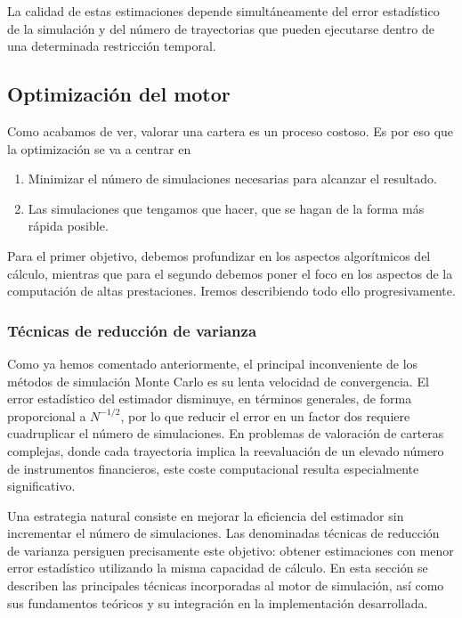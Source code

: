 \documentclass[11pt]{article}
\begin{document}
La calidad de estas estimaciones depende simultáneamente del error estadístico de la simulación y del número de trayectorias que pueden ejecutarse dentro de una determinada restricción temporal.

\subsection{Optimización del motor}

Como acabamos de ver, valorar una cartera es un proceso costoso. Es por eso que la optimización se va a centrar en

\begin{enumerate}
\item Minimizar el número de simulaciones necesarias para alcanzar el resultado.
\item Las simulaciones que tengamos que hacer, que se hagan de la forma más rápida posible.
\end{enumerate}

Para el primer objetivo, debemos profundizar en los aspectos algorítmicos del cálculo, mientras que para el segundo debemos poner el foco en los aspectos de la computación de altas prestaciones. Iremos describiendo todo ello progresivamente.

\subsubsection{Técnicas de reducción de varianza}

Como ya hemos comentado anteriormente, el principal inconveniente de los métodos de simulación Monte Carlo es su lenta velocidad de convergencia. El error estadístico del estimador disminuye, en términos generales, de forma proporcional a $N^{-1/2}$, por lo que reducir el error en un factor dos requiere cuadruplicar el número de simulaciones. En problemas de valoración de carteras complejas, donde cada trayectoria implica la reevaluación de un elevado número de instrumentos financieros, este coste computacional resulta especialmente significativo.

Una estrategia natural consiste en mejorar la eficiencia del estimador sin incrementar el número de simulaciones. Las denominadas técnicas de reducción de varianza persiguen precisamente este objetivo: obtener estimaciones con menor error estadístico utilizando la misma capacidad de cálculo. En esta sección se describen las principales técnicas incorporadas al motor de simulación, así como sus fundamentos teóricos y su integración en la implementación desarrollada.
\end{document}
